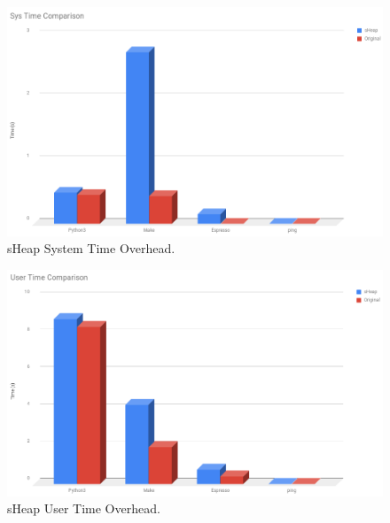 \documentclass[conference]{IEEEtran}
\begin{document}
\begin{figure}[htbp]
  \centering
  \includegraphics[width=\linewidth]{sheap-sys-time-overhead-graph.png}
  \caption{sHeap System Time Overhead.}
  \label{fig:sheap-sys-time-overhead-graph}
\end{figure}

\begin{figure}[htbp]
  \centering
  \includegraphics[width=\linewidth]{sheap-usr-time-overhead-graph.png}
  \caption{sHeap User Time Overhead.}
  \label{fig:sheap-user-time-overhead-graph}
\end{figure}
\end{document}
